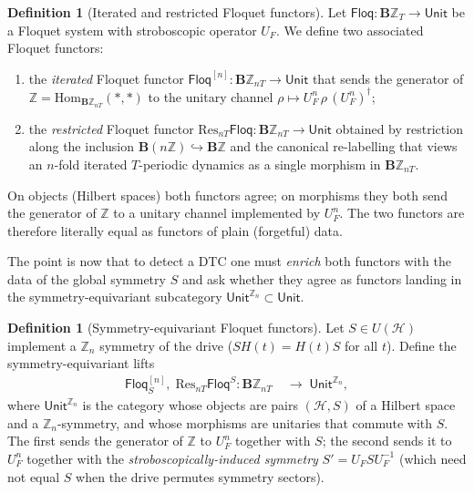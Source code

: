 \documentclass[12pt]{article}
\theoremstyle{definition}
\newtheorem{definition}[theorem]{Definition}
\theoremstyle{remark}
\newcommand{\Hcal}{\mathcal{H}}
\newcommand{\Z}{\mathbb{Z}}
\newcommand{\Floq}{\mathsf{Floq}}
\newcommand{\Res}{\mathrm{Res}}
\begin{document}
\begin{definition}[Iterated and restricted Floquet functors]
\label{def:iterated-restricted}
Let $\Floq\colon\mathbf{B}\Z_T\to\mathsf{Unit}$ be a Floquet system with stroboscopic operator $U_F$. We define two associated Floquet functors:
\begin{enumerate}
\item the \emph{iterated} Floquet functor
$\Floq^{[n]}\colon\mathbf{B}\Z_{nT}\to\mathsf{Unit}$
that sends the generator of $\Z=\mathrm{Hom}_{\mathbf{B}\Z_{nT}}(*,*)$ to the unitary channel
$\rho\mapsto U_F^n\,\rho\,(U_F^n)^\dagger$;
\item the \emph{restricted} Floquet functor
$\Res_{nT}\Floq\colon\mathbf{B}\Z_{nT}\to\mathsf{Unit}$
obtained by restriction along the inclusion $\mathbf{B}(n\Z)\hookrightarrow\mathbf{B}\Z$ and the canonical re-labelling that views an $n$-fold iterated $T$-periodic dynamics as a single morphism in $\mathbf{B}\Z_{nT}$.
\end{enumerate}
On objects (Hilbert spaces) both functors agree; on morphisms they both send the generator of $\Z$ to a unitary channel implemented by $U_F^n$. The two functors are therefore literally equal as functors of plain (forgetful) data.
\end{definition}

The point is now that to detect a DTC one must \emph{enrich} both functors with the data of the global symmetry $S$ and ask whether they agree as functors landing in the symmetry-equivariant subcategory $\mathsf{Unit}^{\Z_n}\subset\mathsf{Unit}$.

\begin{definition}[Symmetry-equivariant Floquet functors]
\label{def:symmetric-floquet}
Let $S\in U(\Hcal)$ implement a $\Z_n$ symmetry of the drive ($SH(t)=H(t)S$ for all $t$). Define the symmetry-equivariant lifts
\begin{align}
\Floq^{[n]}_S,\;\Res_{nT}\Floq^S\colon\mathbf{B}\Z_{nT}\;&\longrightarrow\;\mathsf{Unit}^{\Z_n},
\end{align}
where $\mathsf{Unit}^{\Z_n}$ is the category whose objects are pairs $(\Hcal, S)$ of a Hilbert space and a $\Z_n$-symmetry, and whose morphisms are unitaries that commute with $S$. The first sends the generator of $\Z$ to $U_F^n$ together with $S$; the second sends it to $U_F^n$ together with the \emph{stroboscopically-induced symmetry} $S' = U_F S U_F^{-1}$ (which need not equal $S$ when the drive permutes symmetry sectors).
\end{definition}
\end{document}
